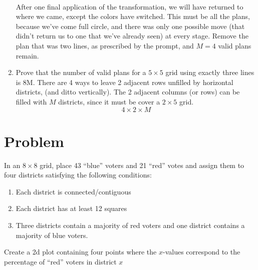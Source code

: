 \documentclass[12pt]{article}
\numberwithin{equation}{section}
\begin{document}
\begin{enumerate}
        \paragraph{} After one final application of the transformation, we will have returned to where we came, except the colors have switched. This must be all the plans, because we've come full circle, and there was only one possible move (that didn't return us to one that we've already seen) at every stage. Remove the plan that was two lines, as prescribed by the prompt, and $M=4$ valid plans remain.
        
        \item Prove that the number of valid plans for a $5\times5$ grid using exactly three lines is 8M.
        There are 4 ways to leave 2 adjacent rows unfilled by horizontal districts, (and ditto vertically). The 2 adjacent columns (or rows) can be filled with $M$ districts, since it must be cover a $2\times5$ grid.
        $$4\times2\times M$$
    \end{enumerate}
    \section{Problem}
    In an $8\times8$ grid, place 43 ``blue'' voters and 21 ``red'' votes and assign them to four districts satisfying the following conditions:
    \begin{enumerate}
        \item Each district is connected/contiguous
        \item Each district has at least 12 squares
        \item Three districts contain a majority of red voters and one district contains a majority of blue voters.
    \end{enumerate}
    Create a 2d plot containing four points where the $x$-values correspond to the percentage of ``red'' voters in district $x$
\end{document}
